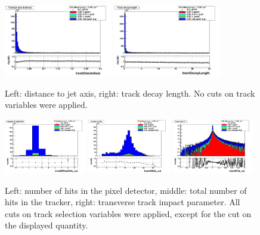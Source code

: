 \begin{figure}[h!]
\centering
\includegraphics[width=0.42\textwidth]{figures/trackDistJetAxis_Linear.png}
\includegraphics[width=0.42\textwidth]{figures/trackDecayLength_Linear.png}
\caption{Left: distance to jet axis, right: track decay length.  No cuts on track variables were applied. }
\label{fig:inputVars3}
\end{figure}

\begin{figure}[h!]
\centering
\includegraphics[width=0.32\textwidth]{figures/trackNPixelHits_cut_Linear.png}
\includegraphics[width=0.32\textwidth]{figures/trackNHits_cut_Linear.png}
\includegraphics[width=0.32\textwidth]{figures/trackIP2d_cut_Log.png}
\caption{Left: number of hits in the pixel detector, middle: total number of hits in the tracker, right: transverse track impact parameter.  All cuts on track selection variables were applied, except for the cut on the displayed quantity.}
\label{fig:inputVars1N}
\end{figure}


